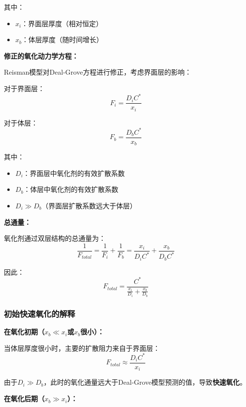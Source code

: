 \documentclass[UTF8,12pt,a4paper]{ctexart}
\begin{document}
其中：
\begin{itemize}
    \item $x_i$：界面层厚度（相对恒定）
    \item $x_b$：体层厚度（随时间增长）
\end{itemize}

\textbf{修正的氧化动力学方程：}

Reisman模型对Deal-Grove方程进行修正，考虑界面层的影响：

对于界面层：
\begin{equation}
F_i = \frac{D_i C^*}{x_i}
\end{equation}

对于体层：
\begin{equation}
F_b = \frac{D_b C^*}{x_b}
\end{equation}

其中：
\begin{itemize}
    \item $D_i$：界面层中氧化剂的有效扩散系数
    \item $D_b$：体层中氧化剂的有效扩散系数
    \item $D_i \gg D_b$（界面层扩散系数远大于体层）
\end{itemize}

\textbf{总通量：}

氧化剂通过双层结构的总通量为：
\begin{equation}
\frac{1}{F_{total}} = \frac{1}{F_i} + \frac{1}{F_b} = \frac{x_i}{D_i C^*} + \frac{x_b}{D_b C^*}
\end{equation}

因此：
\begin{equation}
F_{total} = \frac{C^*}{\frac{x_i}{D_i} + \frac{x_b}{D_b}}
\end{equation}

\subsubsection{初始快速氧化的解释}

\textbf{在氧化初期（$x_b \ll x_i$或$x_b$很小）：}

当体层厚度很小时，主要的扩散阻力来自于界面层：
\begin{equation}
F_{total} \approx \frac{D_i C^*}{x_i}
\end{equation}

由于$D_i \gg D_b$，此时的氧化通量远大于Deal-Grove模型预测的值，导致\textbf{快速氧化}。

\textbf{在氧化后期（$x_b \gg x_i$）：}
\end{document}
